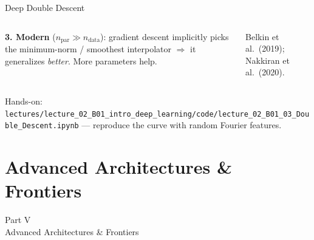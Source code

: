 \documentclass[aspectratio=169,11pt]{beamer}
\newcommand{\emphc}[1]{\textcolor{harvardcrimson}{#1}}
\begin{document}
\begin{frame}{Deep Double Descent}
\begin{columns}[T]
{\vspace{0.06cm}
\textcolor{softgreen}{\textbf{3. Modern}} ($n_\text{par}\!\gg\!n_\text{data}$): gradient descent implicitly picks the \emphc{minimum-norm / smoothest} interpolator $\Rightarrow$ it generalizes \emph{better}. More parameters help.

\vspace{0.08cm}
{\scriptsize Belkin et al.\ (2019); Nakkiran et al.\ (2020).}}
\end{columns}

\vspace{0.05cm}
{\footnotesize\emphc{Hands-on:} \texttt{lectures/lecture\_02\_B01\_intro\_deep\_learning/code/lecture\_02\_B01\_03\_Double\_Descent.ipynb} --- reproduce the curve with random Fourier features.}
\end{frame}


\section{Advanced Architectures \& Frontiers}

\begin{frame}{}
\begin{center}
{\Huge \textcolor{uzhblue}{Part V}}\\[0.8em]
{\LARGE Advanced Architectures \& Frontiers}
\end{center}
\end{frame}
\end{document}
